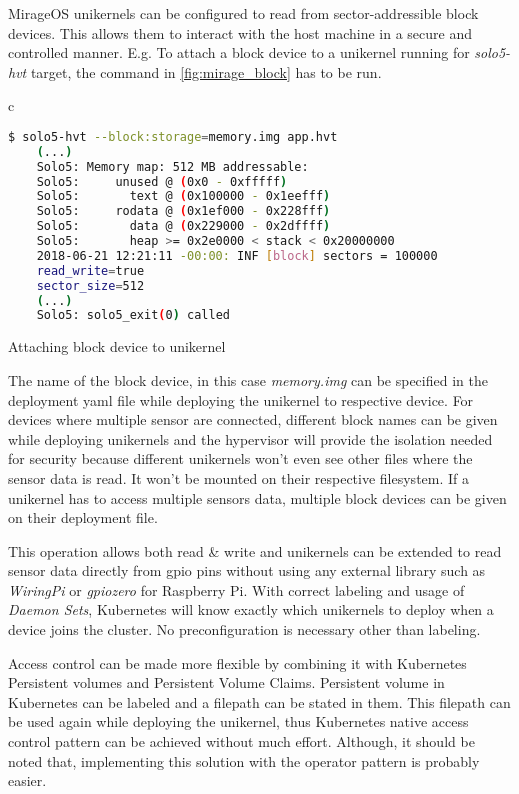 MirageOS unikernels can be configured to read from sector-addressible block devices. This allows them to interact with the host machine in a secure and controlled manner. E.g. To attach a block device to a unikernel running for \textit{solo5-hvt} target, the command in \ref{fig:mirage_block} has to be run.

\begin{code}[htpb]
  \centering
  \begin{tabular}{c}
  \begin{lstlisting}[language=bash]
    $ solo5-hvt --block:storage=memory.img app.hvt
    (...)
    Solo5: Memory map: 512 MB addressable:
    Solo5:     unused @ (0x0 - 0xfffff)
    Solo5:       text @ (0x100000 - 0x1eefff)
    Solo5:     rodata @ (0x1ef000 - 0x228fff)
    Solo5:       data @ (0x229000 - 0x2dffff)
    Solo5:       heap >= 0x2e0000 < stack < 0x20000000
    2018-06-21 12:21:11 -00:00: INF [block] sectors = 100000
    read_write=true
    sector_size=512
    (...)
    Solo5: solo5_exit(0) called
\end{lstlisting}
\end{tabular}
\caption{Attaching block device to unikernel}\label{fig:mirage_block}
\end{code}

The name of the block device, in this case \textit{memory.img} can be specified in the deployment yaml file while deploying the unikernel to respective device. For devices where multiple sensor are connected, different block names can be given while deploying unikernels and the hypervisor will provide the isolation needed for security because different unikernels won't even see other files where the sensor data is read. It won't be mounted on their respective filesystem. If a unikernel has to access multiple sensors data, multiple block devices can be given on their deployment file. 

This operation allows both read \& write and unikernels can be extended to read sensor data directly from gpio pins without using any external library such as \textit{WiringPi} or \textit{gpiozero} for Raspberry Pi. With correct labeling and usage of \textit{Daemon Sets}, Kubernetes will know exactly which unikernels to deploy when a device joins the cluster. No preconfiguration is necessary other than labeling.

Access control can be made more flexible by combining it with Kubernetes Persistent volumes and Persistent Volume Claims. Persistent volume in Kubernetes can be labeled and a filepath can be stated in them. This filepath can be used again while deploying the unikernel, thus Kubernetes native access control pattern can be achieved without much effort. Although, it should be noted that, implementing this solution with the operator pattern is probably easier.